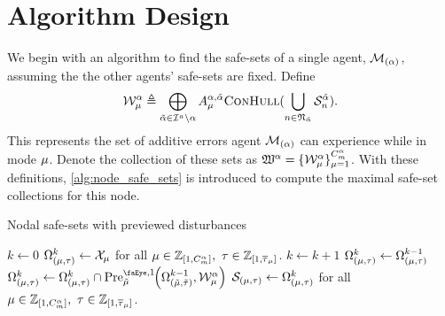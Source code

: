 \section{Algorithm Design}
We begin with an algorithm to find the safe-sets of a single agent, $\mathcal{M}_{(\alpha)}$, assuming the the other agents' safe-sets are fixed. Define 
\begin{equation}
\wcon[\agentidx][\modeidx]\triangleq\bigoplus_{\tilde{\agentidx}\in\agentidxset\setminus\agentidx}A_\modeidx^{\agentidx,\tilde{\agentidx}}\Call{ConHull}{\bigcup_{n\in\mathfrak{N}_{\tilde{\agentidx}}}\mathcal{S}_n^{\tilde{\agentidx}}}.
\end{equation}
This represents the set of additive errors agent $\mathcal{M}_{(\alpha)}$ can experience while in mode ${\mu}$. Denote the collection of these sets as $\wconset{\agentidx}=\{\wcon[\agentidx][\modeidx]\}_{\modeidx=1}^{\nummodes[\agentidx]}$. With these definitions, \autoref{alg:node_safe_sets} is introduced to compute the maximal safe-set collections for this node. 
\begin{algorithm}[t]
\caption{Nodal safe-sets with previewed disturbances}\label{alg:node_safe_sets}
\begin{algorithmic}[1]
\State $k\gets0$
\State $\Omega_{(\modeidx,\sstimerval)}^k\gets\xcon[\modeidx]$ for all $\modeidx\in\int\rii{1}{\nummodes[\agentidx]},\ \sstimerval\in\int\rii{1}{\sstimermax{\modeidx}}$.
\Repeat 
	\State $k\gets k+1$
			\State $\Omega_{({\mu},\tau)}^k\gets\Omega_{({\mu},\tau)}^{k-1}$
			\For{$(\tilde{\modeidx},\tilde{\sstimerval})\in\sspairset{\modeidx}{\sstimerval}$}
				\State $\Omega_{(\modeidx,\sstimerval)}^k\gets\Omega_{(\modeidx,\sstimerval)}^k\cap\PreviewedPre[\tilde{\modeidx}][1]{\Omega_{(\tilde{\modeidx},\tilde{\sstimerval})}^{k-1}, \wcon[\agentidx][\modeidx]}$
			\EndFor
		\EndFor
	\EndFor
{}
$\mathcal{S}_{({\mu},\tau)}\gets\Omega_{({\mu},\tau)}^k$ for all $\modeidx\in\int\rii{1}{\nummodes[\agentidx]},\ \sstimerval\in\int\rii{1}{\sstimermax{\modeidx}}$.\;
\EndProcedure
\end{algorithmic}
\end{algorithm}

